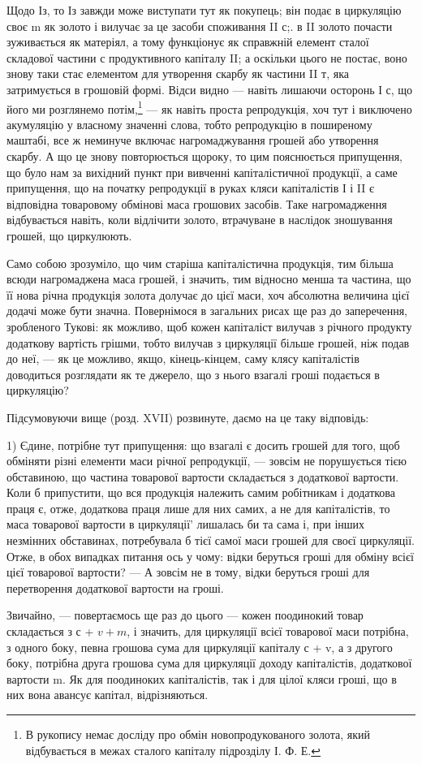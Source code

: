 Щодо Із, то Із завжди може виступати тут як покупець; він подає
в циркуляцію своє m як золото і вилучає за це засоби споживання II с;.
в II золото почасти зуживається як матеріял, а тому функціонує як справжній
елемент сталої складової частини с продуктивного капіталу II; а
оскільки цього не постає, воно знову таки стає елементом для утворення
скарбу як частини II т, яка затримується в грошовій формі. Відси
видно — навіть лишаючи осторонь І с, що його ми розглянемо потім,\footnote{
В рукопису немає досліду про обмін новопродукованого золота, який відбувається
в межах сталого капіталу підрозділу І. Ф. Е.
} —
як навіть проста репродукція, хоч тут і виключено акумуляцію
у власному значенні слова, тобто репродукцію в поширеному маштабі,
все ж неминуче включає нагромаджування грошей або утворення скарбу.
А що це знову повторюється щороку, то цим пояснюється припущення,
що було нам за вихідний пункт при вивченні капіталістичної продукції,
а саме припущення, що на початку репродукції в руках кляси капіталістів
І і II є відповідна товаровому обмінові маса грошових засобів. Таке
нагромадження відбувається навіть, коли відлічити золото, втрачуване в
наслідок зношування грошей, що циркулюють.

Само собою зрозуміло, що чим старіша капіталістична продукція, тим
більша всюди нагромаджена маса грошей, і значить, тим відносно менша
та частина, що її нова річна продукція золота долучає до цієї маси, хоч
абсолютна величина цієї додачі може бути значна. Повернімося в загальних
рисах ще раз до заперечення, зробленого Тукові: як можливо, щоб кожен капіталіст
вилучав з річного продукту додаткову вартість грішми, тобто вилучав
з циркуляції більше грошей, ніж подав до неї, — як це можливо, якщо,
кінець-кінцем, саму клясу капіталістів доводиться розглядати як те джерело,
що з нього взагалі гроші подається в циркуляцію?

Підсумовуючи вище (розд. XVII) розвинуте, даємо на це таку відповідь:

1) Єдине, потрібне тут припущення: що взагалі є досить грошей для
того, щоб обміняти різні елементи маси річної репродукції, — зовсім не
порушується тією обставиною, що частина товарової вартости складається
з додаткової вартости. Коли б припустити, що вся продукція належить
самим робітникам і додаткова праця є, отже, додаткова праця лише для
них самих, а не для капіталістів, то маса товарової вартости в циркуляції'
лишалась би та сама і, при інших незмінних обставинах, потребувала б
тієї самої маси грошей для своєї циркуляції. Отже, в обох випадках питання
ось у чому: відки беруться гроші для обміну всієї цієї товарової
вартости? — А зовсім не в тому, відки беруться гроші для перетворення
додаткової вартости на гроші.

Звичайно, — повертаємось ще раз до цього — кожен поодинокий товар
складається з с + $v + m$, і значить, для циркуляції всієї товарової маси
потрібна, з одного боку, певна грошова сума для циркуляції капіталу с + v,
а з другого боку, потрібна друга грошова сума для циркуляції доходу
капіталістів, додаткової вартости m. Як для поодиноких капіталістів, так
і для цілої кляси гроші, що в них вона авансує капітал, відрізняються.
\parbreak{}  %
